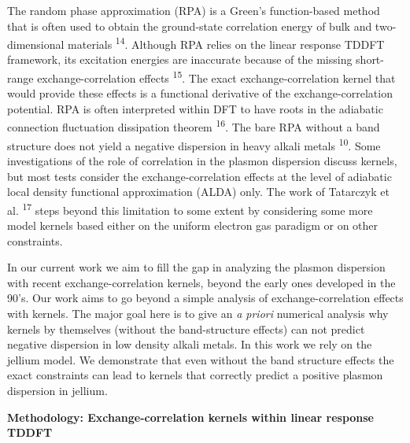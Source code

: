 \documentclass[12pt]{article}
\renewcommand{\_}{\kern-1.5pt\textunderscore\kern-1.5pt}
\begin{document}
\begin{justify}
The random phase approximation (RPA) is a Green’s function-based method that is often used to obtain the ground-state correlation energy of bulk and two-dimensional materials \textsuperscript{14}. Although RPA relies on the linear response TDDFT framework, its excitation energies are inaccurate because of the missing short-range exchange-correlation effects \textsuperscript{15}. The exact exchange-correlation kernel that would provide these effects is a functional derivative of the exchange-correlation potential. RPA is often interpreted within DFT to have roots in the adiabatic connection fluctuation dissipation theorem \textsuperscript{16}. The bare RPA without a band structure does not yield a negative dispersion in heavy alkali metals \textsuperscript{10}. Some investigations of the role of correlation in the plasmon dispersion discuss kernels, but most tests consider the exchange-correlation effects at the level of adiabatic local density functional approximation (ALDA) only. The work of Tatarczyk et al. \textsuperscript{17} steps beyond this limitation to some extent by considering some more model kernels based either on the uniform electron gas paradigm or on other constraints.
\end{justify}\par

\begin{justify}
In our current work we aim to fill the gap in analyzing the plasmon dispersion with recent exchange-correlation kernels, beyond the early ones developed in the 90’s. Our work aims to go beyond a simple analysis of exchange-correlation effects with kernels. The major goal here is to give an \textit{a priori }numerical analysis why kernels by themselves (without the band-structure effects) can not predict negative dispersion in low density alkali metals. In this work we rely on the jellium model. We demonstrate that even without the band structure effects the exact constraints can lead to kernels that correctly predict a positive plasmon dispersion in jellium.
\end{justify}\par


\vspace{\baselineskip}
\setlength{\parskip}{9.96pt}
\setlength{\parskip}{0.0pt}
\begin{justify}
\textbf{Methodology: Exchange-correlation kernels within linear response TDDFT}
\end{justify}\par
\end{document}
